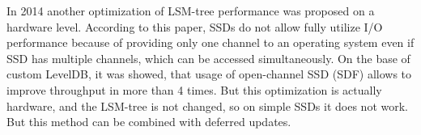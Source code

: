 \documentclass{vldb}
\begin{document}
In 2014 another optimization of LSM-tree performance was proposed
\cite{Wang:open_channel_ssd} on a hardware level. According to this paper, SSDs
do not allow fully utilize I/O performance because of providing only one channel
to an operating system even if SSD has multiple channels, which can be accessed
simultaneously. On the base of custom LevelDB, it was showed, that usage of
open-channel SSD (SDF) allows to improve throughput in more than 4 times. But
this optimization is actually hardware, and the LSM-tree is not changed, so on
simple SSDs it does not work. But this method can be combined with deferred
updates.


\end{document}
